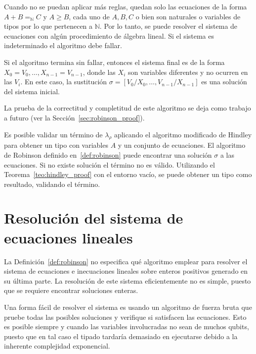 \begin{definicion}
Cuando no se puedan aplicar más reglas, quedan solo las ecuaciones de la forma $A + B =_\mathbb{N} C$ y $A \geq B$, cada uno de $A, B, C$ o bien son naturales o variables de tipos por lo que pertenecen a $\mathbb{N}$. Por lo tanto, se puede resolver el sistema de ecuaciones con algún procedimiento de álgebra lineal. Si el sistema es indeterminado el algoritmo debe fallar.

Si el algoritmo termina sin fallar, entonces el sistema final es de la forma $X_0 = V_0, \dots, X_{n-1} = V_{n-1}$, donde las $X_i$ son variables diferentes y no ocurren en las $V_i$. En este caso, la sustitución $\sigma = [V_0/X_0, \dots, V_{n-1}/X_{n-1}]$ es una solución del sistema inicial.  
\end{definicion}

La prueba de la correctitud y completitud de este algoritmo se deja como trabajo a futuro (ver la Sección~\ref{sec:robinson_proof}).

\begin{corolario}
Es posible validar un término de $\lambda_\rho$ aplicando el algoritmo modificado de Hindley para obtener un tipo con variables $A$ y un conjunto de ecuaciones. El algoritmo de Robinson definido en~\ref{def:robinson} puede encontrar una solución $\sigma$ a las ecuaciones. Si no existe solución el término no es válido. Utilizando el Teorema~\ref{teo:hindley_proof} con el entorno vacío, se puede obtener un tipo como resultado, validando el término.
\end{corolario}
 


\section{Resolución del sistema de ecuaciones lineales}

La Definición~\ref{def:robinson} no especifica qué algoritmo emplear para resolver el sistema de ecuaciones e inecuaciones lineales sobre enteros positivos generado en su última parte. La resolución de este sistema eficientemente no es simple, puesto que se requiere encontrar soluciones enteras. 

Una forma fácil de resolver el sistema es usando un algoritmo de fuerza bruta que pruebe todas las posibles soluciones y verifique si satisfacen las ecuaciones. Esto es posible siempre y cuando las variables involucradas no sean de muchos qubits, puesto que en tal caso el tipado tardaría demasiado en ejecutarse debido a la inherente complejidad exponencial.

